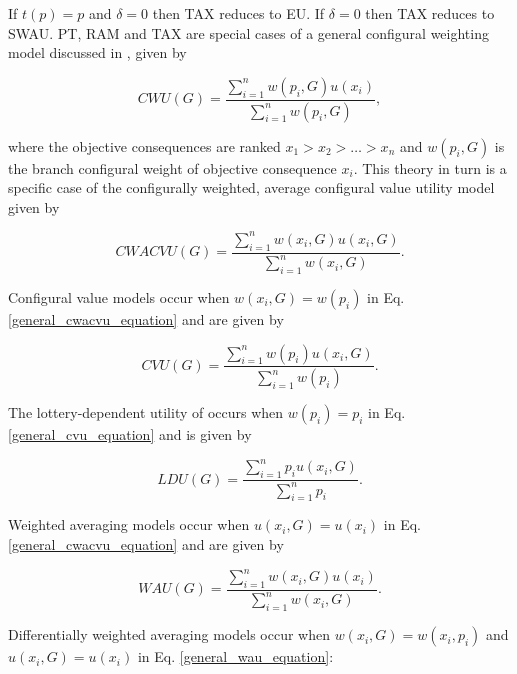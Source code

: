 \documentclass{article}\usepackage[]{graphicx}\usepackage[]{color}
\begin{document}
If $t(p) = p$ and $\delta = 0$ then TAX reduces to EU.
If $\delta = 0$ then TAX reduces to SWAU.
PT, RAM and TAX are special cases of a general configural weighting model discussed in \citet[][p. 91-92]{Birnbaum_2004}, given by

\begin{equation}
CWU(G) = \frac{\displaystyle \sum\limits_{i=1}^{n} w(p_i, G) u(x_i)}{\displaystyle \sum\limits_{i=1}^{n} w(p_i, G)},
\label{general_cwu_equation}
\end{equation}

where the objective consequences are ranked $x_1 > x_2 > \ldots > x_n$ and $w(p_i, G)$ is the branch configural weight of objective consequence $x_i$.
This theory in turn is a specific case of the configurally weighted, average configural value utility model \cite[p. 40]{Birnbaum_1999} given by

\begin{equation}
CWACVU(G) = \frac{\displaystyle \sum\limits_{i=1}^{n} w(x_i, G) u(x_i, G)}{\displaystyle \sum\limits_{i=1}^{n} w(x_i, G)}.
\label{general_cwacvu_equation}
\end{equation}

Configural value models occur when $w(x_i, G) = w(p_i)$ in Eq. \eqref{general_cwacvu_equation} and are given by

\begin{equation}
CVU(G) = \frac{\displaystyle \sum\limits_{i=1}^{n} w(p_i) u(x_i, G)}{\displaystyle \sum\limits_{i=1}^{n} w(p_i)}.
\label{general_cvu_equation}
\end{equation}

The lottery-dependent utility of \cite{Becker_Sarin_1987} occurs when $w(p_i) = p_i$ in Eq. \eqref{general_cvu_equation} and is given by

\begin{equation}
LDU(G) = \frac{\displaystyle \sum\limits_{i=1}^{n} p_i u(x_i, G)}{\displaystyle \sum\limits_{i=1}^{n} p_i}.
\label{ldu_equation}
\end{equation}

Weighted averaging models occur when $u(x_i, G) = u(x_i)$ in Eq. \eqref{general_cwacvu_equation} and are given by

\begin{equation}
WAU(G) = \frac{\displaystyle \sum\limits_{i=1}^{n} w(x_i, G) u(x_i)}{\displaystyle \sum\limits_{i=1}^{n} w(x_i, G)}.
\label{general_wau_equation}
\end{equation}

Differentially weighted averaging models occur when $w(x_i, G) = w(x_i, p_i)$ and $u(x_i, G) = u(x_i)$ in Eq. \eqref{general_wau_equation}:
\end{document}
